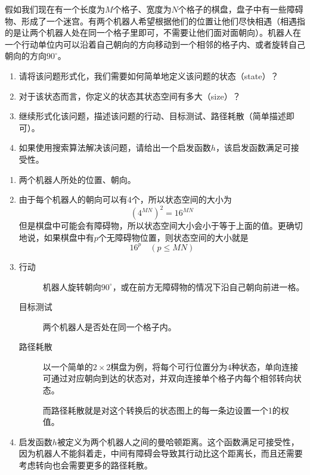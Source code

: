     \begin{problem}
        假如我们现在有一个长度为$M$个格子、宽度为$N$个格子的棋盘，盘子中有一些障碍物、形成了一个迷宫。有两个机器人希望根据他们的位置让他们尽快相遇（相遇指的是让两个机器人处在同一个格子里即可，不需要让他们面对面朝向）。机器人在一个行动单位内可以沿着自己朝向的方向移动到一个相邻的格子内、或者旋转自己朝向的方向$90^{\circ}$。
        \begin{enumerate}
            \item 请将该问题形式化，我们需要如何简单地定义该问题的状态（state）？
            \item 对于该状态而言，你定义的状态其状态空间有多大（size）？
            \item 继续形式化该问题，描述该问题的行动、目标测试、路径耗散（简单描述即可）。
            \item 如果使用搜索算法解决该问题，请给出一个启发函数$h$，该启发函数满足可接受性。
        \end{enumerate}
    \end{problem}

    \begin{solution}
        \begin{enumerate}
            \item 两个机器人所处的位置、朝向。
            \item 由于每个机器人的朝向可以有4个，所以状态空间的大小为
            \begin{equation*}
                (4^{MN})^2=16^{MN}
            \end{equation*}
            但是棋盘中可能会有障碍物，所以状态空间大小会小于等于上面的值。更确切地说，如果棋盘中有$p$个无障碍物位置，则状态空间的大小就是
            \begin{equation*}
                16^p \quad (p\leq MN)
            \end{equation*}
            \item 
            \begin{description}
                \item[行动] 机器人旋转朝向$90^\circ$，或在前方无障碍物的情况下沿自己朝向前进一格。
                \item[目标测试] 两个机器人是否处在同一个格子内。
                \item[路径耗散] 以一个简单的$2\times 2$棋盘为例，将每个可行位置分为4种状态，单向连接可通过对应朝向到达的状态对，并双向连接单个格子内每个相邻转向状态。
                \begin{figure}[H]
                    \centering
                    
                \end{figure} 
                而路径耗散就是对这个转换后的状态图上的每一条边设置一个1的权值。
            \end{description}
            \item 启发函数$h$被定义为两个机器人之间的曼哈顿距离。这个函数满足可接受性，因为机器人不能斜着走，中间有障碍会导致其行动比这个距离长，而且还需要考虑转向也会需要更多的路径耗散。
        \end{enumerate}
    \end{solution}

